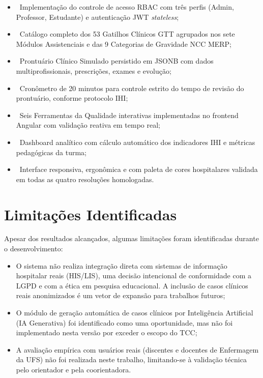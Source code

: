 \begin{itemize}
    \item \checkmark\ Implementação do controle de acesso RBAC com três perfis
    (Admin, Professor, Estudante) e autenticação JWT \textit{stateless};
    \item \checkmark\ Catálogo completo dos 53 Gatilhos Clínicos GTT agrupados
    nos sete Módulos Assistenciais e das 9 Categorias de Gravidade NCC MERP;
    \item \checkmark\ Prontuário Clínico Simulado persistido em JSONB com dados
    multiprofissionais, prescrições, exames e evolução;
    \item \checkmark\ Cronômetro de 20 minutos para controle estrito do tempo de
    revisão do prontuário, conforme protocolo IHI;
    \item \checkmark\ Seis Ferramentas da Qualidade interativas implementadas no
    frontend Angular com validação reativa em tempo real;
    \item \checkmark\ Dashboard analítico com cálculo automático dos indicadores
    IHI e métricas pedagógicas da turma;
    \item \checkmark\ Interface responsiva, ergonômica e com paleta de cores
    hospitalares validada em todas as quatro resoluções homologadas.
\end{itemize}

\section{Limitações Identificadas}
\label{sec_limitacoes}

Apesar dos resultados alcançados, algumas limitações foram identificadas
durante o desenvolvimento:

\begin{itemize}
    \item O sistema não realiza integração direta com sistemas de
    informação hospitalar reais (HIS/LIS), uma decisão intencional de
    conformidade com a LGPD e com a ética em pesquisa educacional.
    A inclusão de casos clínicos reais anonimizados é um vetor de
    expansão para trabalhos futuros;
    \item O módulo de geração automática de casos clínicos por
    Inteligência Artificial (IA Generativa) foi identificado como uma
    oportunidade, mas não foi implementado nesta versão por exceder o
    escopo do TCC;
    \item A avaliação empírica com usuários reais (discentes e docentes de
    Enfermagem da UFS) não foi realizada neste trabalho, limitando-se à
    validação técnica pelo orientador e pela coorientadora.
\end{itemize}

